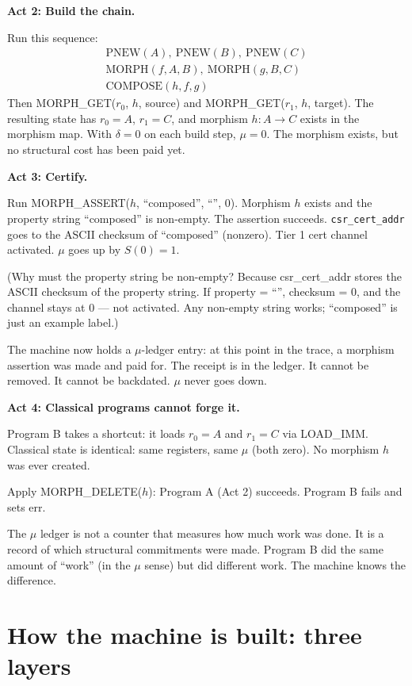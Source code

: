 \documentclass[11pt,a4paper]{article}
\theoremstyle{plain}
\theoremstyle{definition}
\theoremstyle{remark}
\begin{document}
\medskip
\noindent\textbf{Act 2: Build the chain.}

Run this sequence:
\begin{gather*}
\text{PNEW}(A),\ \text{PNEW}(B),\ \text{PNEW}(C) \\
\text{MORPH}(f,A,B),\ \text{MORPH}(g,B,C) \\
\text{COMPOSE}(h,f,g)
\end{gather*}
Then MORPH\_GET($r_0$, $h$, source) and MORPH\_GET($r_1$, $h$, target). The resulting state has $r_0 = A$, $r_1 = C$, and morphism $h : A \to C$ exists in the morphism map. With $\delta = 0$ on each build step, $\mu = 0$. The morphism exists, but no structural cost has been paid yet.

\medskip
\noindent\textbf{Act 3: Certify.}

Run MORPH\_ASSERT($h$, ``composed'', ``'', 0). Morphism $h$ exists and the property string ``composed'' is non-empty. The assertion succeeds. \texttt{csr\_cert\_addr} goes to the ASCII checksum of ``composed'' (nonzero). Tier 1 cert channel activated. $\mu$ goes up by $S(0) = 1$.

(Why must the property string be non-empty? Because csr\_cert\_addr stores the ASCII checksum of the property string. If property = ``'', checksum = 0, and the channel stays at 0 --- not activated. Any non-empty string works; ``composed'' is just an example label.)

The machine now holds a $\mu$-ledger entry: at this point in the trace, a morphism assertion was made and paid for. The receipt is in the ledger. It cannot be removed. It cannot be backdated. $\mu$ never goes down.

\medskip
\noindent\textbf{Act 4: Classical programs cannot forge it.}

Program B takes a shortcut: it loads $r_0 = A$ and $r_1 = C$ via LOAD\_IMM. Classical state is identical: same registers, same $\mu$ (both zero). No morphism $h$ was ever created.

Apply MORPH\_DELETE($h$): Program A (Act 2) succeeds. Program B fails and sets err.

The $\mu$ ledger is not a counter that measures how much work was done. It is a record of which structural commitments were made. Program B did the same amount of ``work'' (in the $\mu$ sense) but did different work. The machine knows the difference.

\section{How the machine is built: three layers}
\label{sec:hardware}
\end{document}
